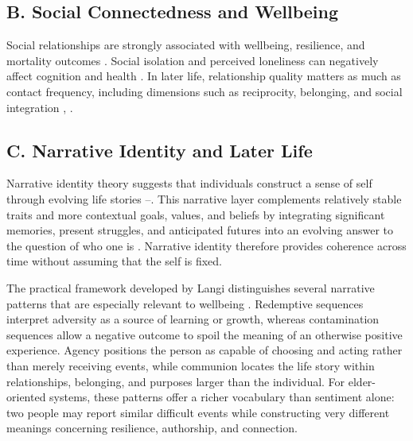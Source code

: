 \documentclass[
  journal,
]{IEEEtran}%
\begin{document}
\subsection{B. Social Connectedness and
Wellbeing}\label{b.-social-connectedness-and-wellbeing}

Social relationships are strongly associated with wellbeing, resilience,
and mortality outcomes . Social
isolation and perceived loneliness can negatively affect cognition and
health . In later life,
relationship quality matters as much as contact frequency, including
dimensions such as reciprocity, belonging, and social integration
,
.

\subsection{C. Narrative Identity and Later
Life}\label{c.-narrative-identity-and-later-life}

Narrative identity theory suggests that individuals construct a sense of
self through evolving life stories
--.
This narrative layer complements relatively stable traits and more
contextual goals, values, and beliefs by integrating significant
memories, present struggles, and anticipated futures into an evolving
answer to the question of who one is
. Narrative identity therefore
provides coherence across time without assuming that the self is fixed.

The practical framework developed by Langi distinguishes several
narrative patterns that are especially relevant to wellbeing
. Redemptive sequences interpret
adversity as a source of learning or growth, whereas contamination
sequences allow a negative outcome to spoil the meaning of an otherwise
positive experience. Agency positions the person as capable of choosing
and acting rather than merely receiving events, while communion locates
the life story within relationships, belonging, and purposes larger than
the individual. For elder-oriented systems, these patterns offer a
richer vocabulary than sentiment alone: two people may report similar
difficult events while constructing very different meanings concerning
resilience, authorship, and connection.
\end{document}
